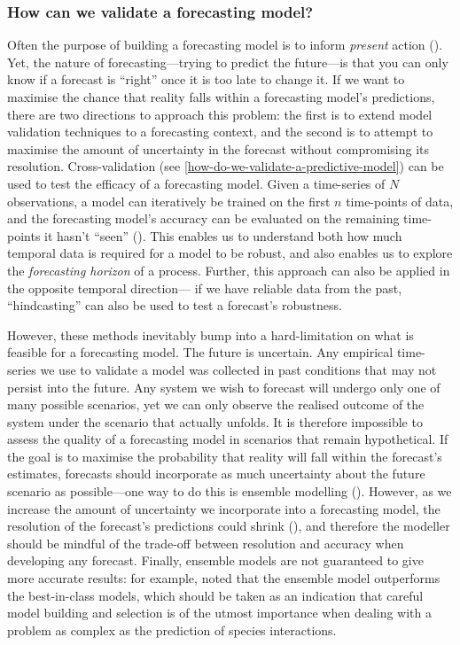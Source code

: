 \begin{refsection}
\subsubsection{How can we validate a forecasting
model?}\label{how-can-we-validate-a-forecasting-model}

Often the purpose of building a forecasting model is to inform
\emph{present} action (\cite{Dietze2018IteNea}). Yet, the nature of
forecasting---trying to predict the future---is that you can only know
if a forecast is ``right'' once it is too late to change it. If we want
to maximise the chance that reality falls within a forecasting model's
predictions, there are two directions to approach this problem: the
first is to extend model validation techniques to a forecasting context,
and the second is to attempt to maximise the amount of uncertainty in
the forecast without compromising its resolution. Cross-validation (see
\autoref{how-do-we-validate-a-predictive-model}) can be used to test the
efficacy of a forecasting model. Given a time-series of \(N\)
observations, a model can iteratively be trained on the first \(n\)
time-points of data, and the forecasting model's accuracy can be
evaluated on the remaining time-points it hasn't ``seen''
(\cite{Bishop2006PatRec}). This enables us to understand both how much
temporal data is required for a model to be robust, and also enables us
to explore the \emph{forecasting horizon} of a process. Further, this
approach can also be applied in the opposite temporal direction--- if we
have reliable data from the past, ``hindcasting'' can also be used to
test a forecast's robustness.

However, these methods inevitably bump into a hard-limitation on what is
feasible for a forecasting model. The future is uncertain. Any empirical
time-series we use to validate a model was collected in past conditions
that may not persist into the future. Any system we wish to forecast
will undergo only one of many possible scenarios, yet we can only
observe the realised outcome of the system under the scenario that
actually unfolds. It is therefore impossible to assess the quality of a
forecasting model in scenarios that remain hypothetical. If the goal is
to maximise the probability that reality will fall within the forecast's
estimates, forecasts should incorporate as much uncertainty about the
future scenario as possible---one way to do this is ensemble modelling
(\cite{Parker2013EnsMod}). However, as we increase the amount of
uncertainty we incorporate into a forecasting model, the resolution of
the forecast's predictions could shrink (\cite{Lei2017EvaTra}), and
therefore the modeller should be mindful of the trade-off between
resolution and accuracy when developing any forecast. Finally, ensemble
models are not guaranteed to give more accurate results: for example,
\cite{Becker2020PreWil} noted that the ensemble model outperforms the
best-in-class models, which should be taken as an indication that
careful model building and selection is of the utmost importance when
dealing with a problem as complex as the prediction of species
interactions.


\end{refsection}
